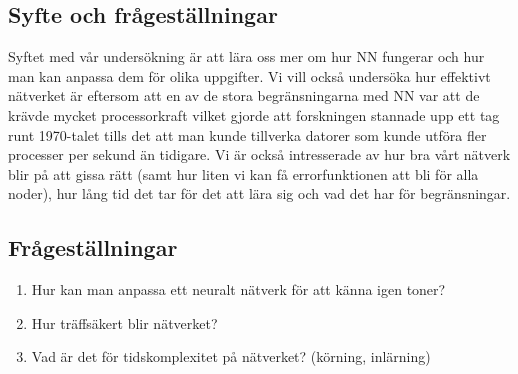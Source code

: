 \documentclass[a4paper,10pt]{article}
\begin{document}





\subsection{Syfte och frågeställningar}

Syftet med vår undersökning är att lära oss mer om hur NN fungerar och hur man kan anpassa dem för olika uppgifter. Vi vill också undersöka hur effektivt nätverket är eftersom att en av de stora begränsningarna med NN var att de krävde mycket processorkraft vilket gjorde att forskningen stannade upp ett tag runt 1970-talet tills det att man kunde tillverka datorer som kunde utföra fler processer per sekund än tidigare. Vi är också intresserade av hur bra vårt nätverk blir på att gissa rätt (samt hur liten vi kan få errorfunktionen att bli för alla noder), hur lång tid det tar för det att lära sig och vad det har för begränsningar.

\break
\subsection{Frågeställningar}
\begin{enumerate}
\item Hur kan man anpassa ett neuralt nätverk för att känna igen toner?
\item Hur träffsäkert blir nätverket?
\item Vad är det för tidskomplexitet på nätverket? (körning, inlärning)
\end{enumerate}
\end{document}
